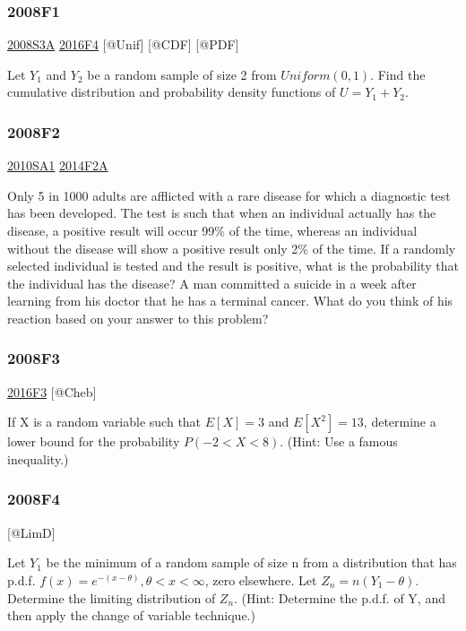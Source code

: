 \documentclass[6pt,twocolumn,Portrait]{article}
\begin{document}
\hypertarget{f1-3}{%
\subsubsection{2008F1}\label{f1-3}}

\protect\hyperlink{s3a}{2008S3A} \protect\hyperlink{f4-6}{2016F4}
{[}@Unif{]} {[}@CDF{]} {[}@PDF{]}

Let \(Y_1\) and \(Y_2\) be a random sample of size 2 from
\(Uniform(0,1)\). Find the cumulative distribution and probability
density functions of \(U=Y_1+Y_2\).

\hypertarget{f2-3}{%
\subsubsection{2008F2}\label{f2-3}}

\protect\hyperlink{sa1-1}{2010SA1} \protect\hyperlink{f2a-1}{2014F2A}

Only 5 in 1000 adults are afflicted with a rare disease for which a
diagnostic test has been developed. The test is such that when an
individual actually has the disease, a positive result will occur 99\%
of the time, whereas an individual without the disease will show a
positive result only 2\% of the time. If a randomly selected individual
is tested and the result is positive, what is the probability that the
individual has the disease? A man committed a suicide in a week after
learning from his doctor that he has a terminal cancer. What do you
think of his reaction based on your answer to this problem?

\hypertarget{f3-3}{%
\subsubsection{2008F3}\label{f3-3}}

\protect\hyperlink{f3-6}{2016F3} {[}@Cheb{]}

If X is a random variable such that \(E[X]=3\) and \(E[X^2]=13\),
determine a lower bound for the probability \(P(-2<X<8)\). (Hint: Use a
famous inequality.)

\hypertarget{f4-3}{%
\subsubsection{2008F4}\label{f4-3}}

{[}@LimD{]}

Let \(Y_1\) be the minimum of a random sample of size n from a
distribution that has p.d.f. \(f(x)=e^{-(x-\theta)},\theta<x<\infty\),
zero elsewhere. Let \(Z_n= n(Y_1-\theta)\). Determine the limiting
distribution of \(Z_n\). (Hint: Determine the p.d.f. of Y, and then
apply the change of variable technique.)
\end{document}
